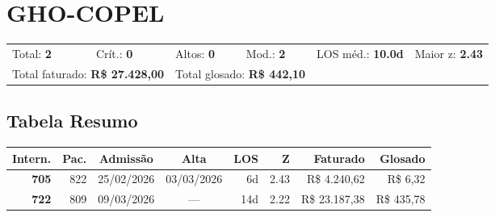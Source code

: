 \documentclass[a4paper,10pt]{article}
\begin{document}
\clearpage
\section{GHO-COPEL}
\begin{tcolorbox}[colback=lightblue,colframe=jcubeblue,title={\textbf{Resumo --- GHO-COPEL}}]
\begin{tabular}{ll@{\quad}ll@{\quad}ll}
Total: \textbf{2} &
Cr\'{i}t.: \textcolor{anomred}{\textbf{0}} &
Altos: \textcolor{anomorange}{\textbf{0}} &
Mod.: \textcolor{anomyellow}{\textbf{2}} &
LOS m\'{e}d.: \textbf{10.0d} &
Maior z: \textbf{2.43} \\

\multicolumn{2}{l}{Total faturado: \textbf{R\$ 27.428,00}} & 
\multicolumn{2}{l}{\textcolor{anomred}{Total glosado: \textbf{R\$ 442,10}}} & & \\

\end{tabular}
\end{tcolorbox}

\subsection{Tabela Resumo}
\begin{center}
\begin{longtable}{>{\scriptsize}r>{\scriptsize}r>{\scriptsize}c>{\scriptsize}c>{\scriptsize}r>{\scriptsize}r>{\scriptsize}r>{\scriptsize}r}
\toprule
\textbf{Intern.} & \textbf{Pac.} & \textbf{Admiss\~{a}o} & \textbf{Alta} & \textbf{LOS} & \textbf{Z} & \textbf{Faturado} & \textbf{Glosado} \\
\midrule
\endhead
\bottomrule
\endfoot

\textcolor{anomyellow}{\textbf{705}} & 822 & 25/02/2026 & 03/03/2026 & 6d & \textcolor{anomyellow}{2.43} & R\$ 4.240,62 & \textcolor{anomred}{R\$ 6,32} \\

\textcolor{anomyellow}{\textbf{722}} & 809 & 09/03/2026 & — & 14d & \textcolor{anomyellow}{2.22} & R\$ 23.187,38 & \textcolor{anomred}{R\$ 435,78} \\

\end{longtable}\end{center}
\end{document}
